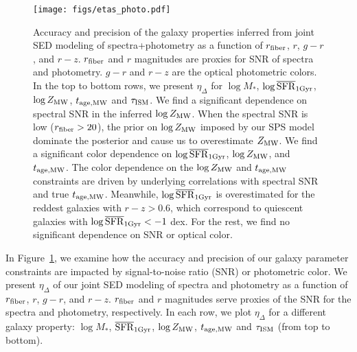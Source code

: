 \begin{figure}
\begin{center}
    \texttt{[image: figs/etas\_photo.pdf]}
    \caption{
        Accuracy and precision of the galaxy properties inferred from joint SED
        modeling of spectra+photometry as a function of $r_{\rm fiber}$, $r$,
        $g-r$, and $r-z$.
        $r_{\rm fiber}$ and $r$ magnitudes are proxies for SNR of spectra and
        photometry. 
        $g-r$ and $r-z$ are the optical photometric colors. 
        In the top to bottom rows, we present $\eta_\Delta$ for $\log M_*$,
        $\log\overline{\rm SFR}_{\rm 1Gyr}$, $\log Z_{\rm MW}$, $t_{\rm age, MW}$ and $\tau_{\rm ISM}$.
        We find a significant dependence on spectral SNR in the inferred 
        $\log Z_{\rm MW}$. 
        When the spectral SNR is low ($r_{\rm fiber} > 20$), the prior on 
        $\log Z_{\rm MW}$ imposed by our SPS model dominate the posterior and
        cause us to overestimate $Z_{\rm MW}$. 
        We find a significant color dependence on $\log\overline{\rm SFR}_{\rm 1Gyr}$, $\log Z_{\rm
        MW}$, and $t_{\rm age, MW}$. 
        The color dependence on the $\log Z_{\rm MW}$ and $t_{\rm age, MW}$ constraints are
        driven by underlying correlations with spectral SNR and true $t_{\rm age, MW}$. 
        Meanwhile, $\log\overline{\rm SFR}_{\rm 1Gyr}$ is overestimated for the reddest galaxies with
        $r - z > 0.6$, which correspond to quiescent galaxies with $\log\overline{\rm SFR}_{\rm 1Gyr}
        < -1$ dex. 
        For the rest, we find no significant dependence on SNR or optical
        color. 
    }    
    \label{fig:eta_photo}
\end{center}
\end{figure}

In Figure~\ref{fig:eta_photo}, we examine how the accuracy and precision of
our galaxy parameter constraints are impacted by signal-to-noise ratio (SNR) or
photometric color. 
We present $\eta_\Delta$ of our joint SED modeling of spectra and photometry as
a function of $r_{\rm fiber}$, $r$, $g-r$, and $r-z$. 
$r_{\rm fiber}$ and $r$ magnitudes serve proxies of the SNR for the spectra and
photometry, respectively. 
In each row, we plot $\eta_\Delta$ for a different galaxy property: $\log M_*$,
$\overline{\rm SFR}_{\rm 1Gyr}$, $\log Z_{\rm MW}$, $t_{\rm age, MW}$ and $\tau_{\rm ISM}$ (from top to bottom).

